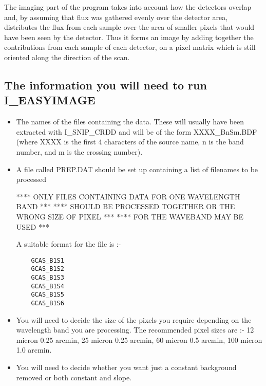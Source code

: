 The imaging part of the program takes into account how the detectors
overlap and, by assuming that flux was gathered evenly over the detector area,
distributes the flux from each sample over the area of smaller pixels that
would have been seen by the detector. Thus it forms an image by adding
together the contributions from each sample of each detector, on a pixel matrix
which is still oriented along the direction of the scan.

\subsection {The information you will need to run I\_EASYIMAGE}

\begin {itemize}

\item The names of the files containing the data. These will usually have been
extracted with I\_SNIP\_CRDD and will be of the form XXXX\_BnSm.BDF
(where XXXX is the first 4 characters of the source name, n is the band
number, and m is the crossing number).

\item A file called PREP.DAT should be set up containing a list of filenames to
be processed 

**** \hfill ONLY FILES CONTAINING DATA FOR ONE WAVELENGTH BAND \hfill****
\linebreak
**** \hfill SHOULD BE PROCESSED TOGETHER OR THE WRONG SIZE OF PIXEL \hfill****
\linebreak
**** \hfill FOR THE WAVEBAND MAY BE USED \hfill****

A suitable format for the file is :-

\begin{verbatim}
	GCAS_B1S1
	GCAS_B1S2
	GCAS_B1S3
	GCAS_B1S4
	GCAS_B1S5
	GCAS_B1S6
\end{verbatim}

\item You will need to decide the size of the pixels you require depending
on the wavelength band you are processing. The recommended pixel sizes are :-
12 micron  0.25 arcmin, 25 micron  0.25 arcmin, 60 micron   0.5 arcmin,
100 micron  1.0 arcmin.                                  

\item You will need to decide whether you want just a constant background
removed or both constant and slope.

\end {itemize}

